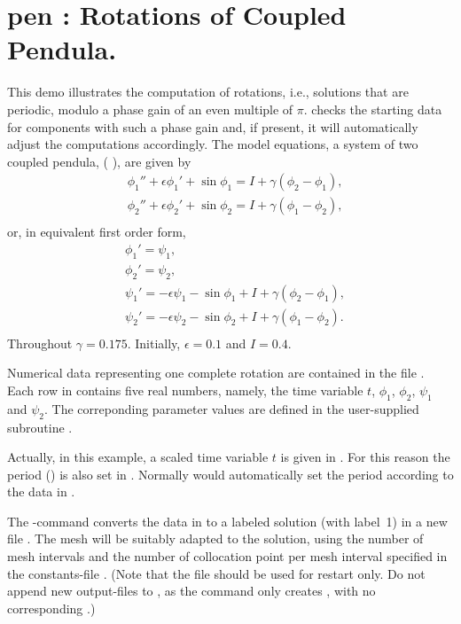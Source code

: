 \documentclass[12pt]{report}
\def\eps{\epsilon}
\begin{document}
\section{ pen : Rotations of Coupled Pendula.} \label{sec:Demos_pen}
This demo illustrates the computation of rotations, i.e., solutions that
are periodic, modulo a phase gain of an even multiple of $\pi$.
\AUTO checks the starting data for components with such a phase gain
and, if present, it will automatically adjust the computations accordingly.
The model equations, a system of two coupled  pendula, 
( \citeyear{DoArOt:91}),
are given by
\begin{equation} \begin{array}{cl}
 & \phi_1'' + \eps \phi_1' + \sin \phi_1 
  = I + \gamma(\phi_2-\phi_1), \\
 & \phi_2'' + \eps \phi_2' + \sin \phi_2 
  = I + \gamma(\phi_1-\phi_2) ,\\
\end{array} \end{equation}
or, in equivalent first order form,
\begin{equation} \begin{array}{cl}
 & \phi_1'  =  \psi_1, \\
 & \phi_2'  =  \psi_2, \\
 & \psi_1'  = - \eps \psi_1 - \sin \phi_1 + I + \gamma(\phi_2-\phi_1), \\
 & \psi_2'  = - \eps \psi_2 - \sin \phi_2 + I + \gamma(\phi_1-\phi_2).\\
\end{array} \end{equation}
Throughout $\gamma=0.175$. Initially, $\eps=0.1$ and $I=0.4$.

Numerical data representing one complete rotation are
contained in the file . 
Each row in  contains five real numbers, namely,
the time variable $t$, $\phi_1$, $\phi_2$, $\psi_1$ and $\psi_2$.
The correponding parameter values are defined in the user-supplied subroutine
.

Actually, in this example, a scaled time variable $t$ is given in . 
For this reason the period () is also set in .
Normally \AUTO would automatically set the period according to
the data in .

The \AUTO-command  converts the data in 
to a labeled
\AUTO solution (with label~1) in a new file .
The mesh will be suitably adapted to the solution, using the number of
mesh intervals  and the number of collocation point per mesh
interval  specified in the constants-file .
(Note that the file  should be used for restart only.
Do not append new output-files to , as the command 
only creates , with no corresponding .)
\end{document}
